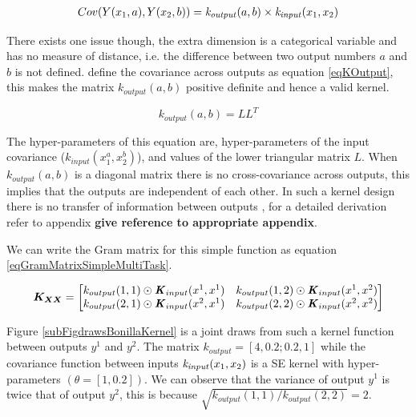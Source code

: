 \begin{align}\label{eqBonillaMTGP}
    Cov(Y(x_{1}, a), Y(x_{2}, b)) = \mathit{k_{output}}(a, b) \times \mathit{k_{input}}(x_{1}, x_{2})
\end{align}

There exists one issue though, the extra dimension is a categorical variable and has no measure of distance, i.e. the difference between two output numbers $a$ and $b$ is not defined. \cite{bonilla2007multi} define the covariance across outputs as equation \ref{eqKOutput}, this makes the matrix $k_{output}(a, b)$ positive definite and hence a valid kernel.

\begin{equation}\label{eqKOutput}
k_{output}(a, b) = LL^T
\end{equation}

The hyper-parameters of this equation are, hyper-parameters of the input covariance ($k_{input}(x_{1}^{a}, x_{2}^{b})$), and values of the lower triangular matrix $L$. When $k_{output}(a, b)$ is a diagonal matrix there is no cross-covariance across outputs, this implies that the outputs are independent of each other. In such a kernel design there is no transfer of information between outputs \cite{bonilla2007multi, o1998markov}, for a detailed derivation refer to appendix \textbf{give reference to appropriate appendix}.

We can write the Gram matrix for this simple function as equation \ref{eqGramMatrixSimpleMultiTask}.

\begin{equation}\label{eqGramMatrixSimpleMultiTask}
   \boldsymbol{K_{XX}} =  \begin{bmatrix} k_{output}(1, 1) \odot \bm{\mathit{K}}_{input}(x^{1}, x^{1}) & 
k_{output}(1, 2) \odot \bm{\mathit{K}}_{input}(x^{1}, x^{2}) \\ 
k_{output}(2, 1) \odot \bm{\mathit{K}}_{input}(x^{2}, x^{1}) &
k_{output}(2, 2) \odot \bm{\mathit{K}}_{input}(x^{2}, x^{2}) 
\end{bmatrix}
\end{equation}

Figure \ref{subFigdrawsBonillaKernel} is a joint draws from such a kernel function between outputs $y^{1}$ and $y^{2}$. The matrix $k_{output} = [4, 0.2; 0.2, 1]$ while the covariance function between inputs $\mathit{k_{input}}(x_{1}, x_{2})$ is a SE kernel with hyper-parameters $(\theta = [1, 0.2])$. We can observe that the variance of output $y^{1}$ is twice that of output $y^{2}$, this is because $\sqrt{k_{output}(1, 1)/k_{output}(2, 2)} = 2$.


